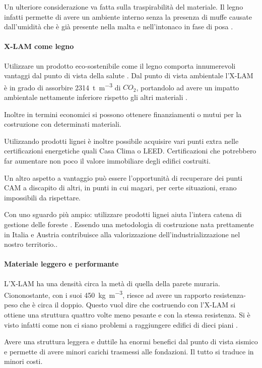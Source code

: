 Un ulteriore considerazione va fatta sulla traspirabilità del materiale. 
Il legno infatti permette di avere un ambiente interno senza la presenza di muffe causate dall'umidità che è già presente nella malta e nell'intonaco in fase di posa \cite{sutton_introduction_nodate}.
\paragraph{X-LAM come legno}
Utilizzare un prodotto eco-sostenibile come il legno comporta innumerevoli vantaggi dal punto di vista della salute \cite{EnergyCost}. Dal punto di vista ambientale l'X-LAM è in grado di assorbire \SI{2314}{\tonne \per \cubic\metre} di $CO_2$, portandolo ad avere un impatto ambientale nettamente inferiore rispetto gli altri materiali \cite{hammond2011inventory}.

Inoltre in termini economici si possono ottenere finanziamenti o mutui per la costruzione con determinati materiali. 

Utilizzando prodotti lignei è inoltre possibile acquisire vari punti extra nelle certificazioni energetiche quali Casa Clima o LEED. 
Certificazioni che potrebbero far aumentare non poco il valore immobiliare degli edifici costruiti. 

Un altro aspetto a vantaggio può essere l'opportunità di recuperare dei punti CAM a discapito di altri, in punti in cui magari, per certe situazioni, erano impossibili da rispettare.

Con uno sguardo più ampio: utilizzare prodotti lignei aiuta l'intera catena di gestione delle foreste \cite{callegari2010production}. 
Essendo una metodologia di costruzione nata prettamente in Italia e Austria contribuisce alla valorizzazione dell'industrializzazione nel nostro territorio..
\paragraph{Materiale leggero e performante}
L'X-LAM ha una densità circa la metà di quella della parete muraria. 
Ciononostante, con i suoi \SI{450}{\kilogram\per\cubic\metre}, riesce ad avere un rapporto resistenza-peso che è circa il doppio. 
Questo vuol dire che costruendo con l'X-LAM si ottiene una struttura quattro volte meno pesante e con la stessa resistenza. 
Si è visto infatti come non ci siano problemi a raggiungere edifici di dieci piani \cite{10storey}.

Avere una struttura leggera e duttile ha enormi benefici dal punto di vista sismico e permette di avere minori carichi trasmessi alle fondazioni. 
Il tutto si traduce in minori costi.


